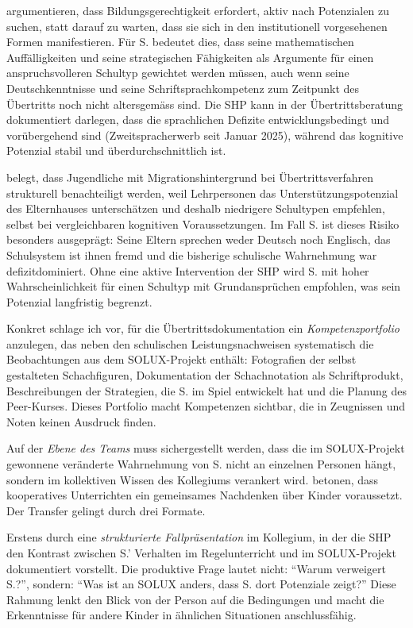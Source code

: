 \documentclass[ngerman, a4paper]{article}
\begin{document}
\textcite{sedmak2021bildungsgerechtigkeit} argumentieren, dass Bildungsgerechtigkeit erfordert, aktiv
nach Potenzialen zu suchen, statt darauf zu warten, dass sie sich in den
institutionell vorgesehenen Formen manifestieren. Für S. bedeutet dies, dass seine
mathematischen Auffälligkeiten und seine strategischen Fähigkeiten als
Argumente für einen anspruchsvolleren Schultyp gewichtet werden müssen, auch
wenn seine Deutschkenntnisse und seine Schriftsprachkompetenz zum Zeitpunkt
des Übertritts noch nicht altersgemäss sind. Die SHP kann in der
Übertrittsberatung dokumentiert darlegen, dass die sprachlichen Defizite
entwicklungsbedingt und vorübergehend sind (Zweitspracherwerb seit Januar 2025),
während das kognitive Potenzial stabil und überdurchschnittlich ist.

\textcite[S.\,90--104]{leikhof2021jugendliche} belegt, dass Jugendliche mit Migrationshintergrund bei
Übertrittsverfahren strukturell benachteiligt werden, weil Lehrpersonen
das Unterstützungspotenzial des Elternhauses unterschätzen und deshalb
niedrigere Schultypen empfehlen, selbst bei vergleichbaren kognitiven
Voraussetzungen. Im Fall S. ist dieses
Risiko besonders ausgeprägt: Seine Eltern sprechen weder Deutsch noch Englisch,
das Schulsystem ist ihnen fremd und die bisherige schulische Wahrnehmung
war defizitdominiert. Ohne eine aktive Intervention der SHP wird S. mit hoher
Wahrscheinlichkeit für einen Schultyp mit Grundansprüchen empfohlen, was
sein Potenzial langfristig begrenzt.

Konkret schlage ich vor, für die Übertrittsdokumentation ein
\textit{Kompetenzportfolio} anzulegen, das neben den schulischen
Leistungsnachweisen systematisch die Beobachtungen aus dem SOLUX-Projekt
enthält: Fotografien der selbst gestalteten Schachfiguren, Dokumentation
der Schachnotation als Schriftprodukt, Beschreibungen der Strategien, die
S. im Spiel entwickelt hat und die Planung des Peer-Kurses. Dieses Portfolio
macht Kompetenzen sichtbar, die in Zeugnissen und Noten keinen Ausdruck finden.

Auf der \textit{Ebene des Teams} muss sichergestellt werden, dass die im
SOLUX-Projekt gewonnene veränderte Wahrnehmung von S. nicht an einzelnen
Personen hängt, sondern im kollektiven Wissen des Kollegiums verankert wird.
\textcite{buholzer2010allegleich} betonen, dass kooperatives Unterrichten ein gemeinsames
Nachdenken über Kinder voraussetzt. Der
Transfer gelingt durch drei Formate.

Erstens durch eine \textit{strukturierte Fallpräsentation} im Kollegium, in
der die SHP den Kontrast zwischen S.' Verhalten im Regelunterricht und im
SOLUX-Projekt dokumentiert vorstellt. Die produktive Frage lautet nicht:
\enquote{Warum verweigert S.?}, sondern: \enquote{Was ist an SOLUX anders, dass
S. dort Potenziale zeigt?} Diese Rahmung lenkt den Blick von der Person auf
die Bedingungen und macht die Erkenntnisse für andere Kinder in ähnlichen
Situationen anschlussfähig.
\end{document}
